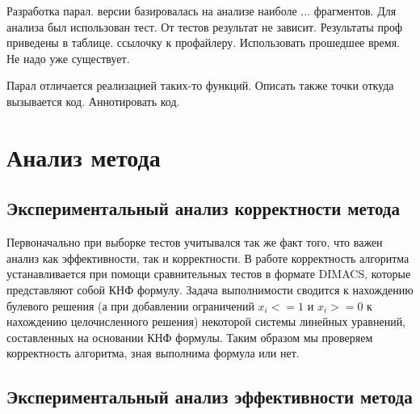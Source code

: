 \documentclass[a4paper,14pt,russian]{extreport}
\begin{document}
Разработка парал. версии базировалась на анализе наиболе ... фрагментов. Для анализа был использован тест. От тестов результат не зависит. Результаты проф приведены в таблице. ссылочку к профайлеру. Использовать прошедшее время. Не надо уже существует. 

Парал отличается реализацией таких-то функций. Описать также точки откуда вызывается код. Аннотировать код. 

\chapter{Анализ метода}

\section{Экспериментальный анализ корректности метода}

Первоначально при выборке тестов учитывался так же факт того, что важен анализ как эффективности, так и корректности. В работе корректность алгоритма устанавливается при помощи сравнительных тестов в формате DIMACS, которые представляют собой КНФ формулу. Задача выполнимости сводится к нахождению булевого решения (а при добавлении ограничений $x_i <= 1$ и $x_i >= 0$ к нахождению целочисленного решения) некоторой системы линейных уравнений, составленных на основании КНФ формулы. Таким образом мы проверяем корректность алгоритма, зная выполнима формула или нет.


\section{Экспериментальный анализ эффективности метода}
\end{document}
